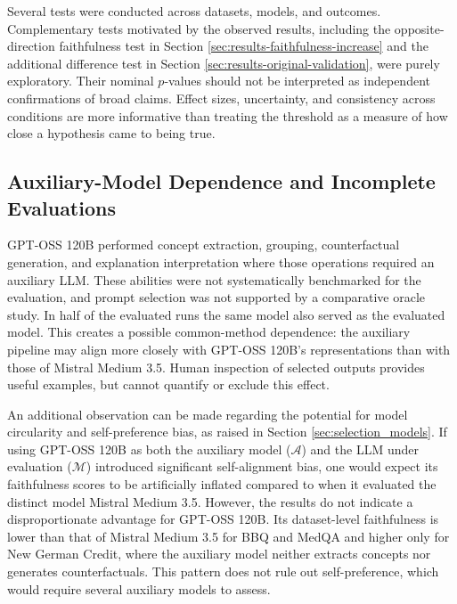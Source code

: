 Several tests were conducted across datasets, models, and outcomes. Complementary tests motivated by the observed results, including the opposite-direction faithfulness test in Section \ref{sec:results-faithfulness-increase} and the additional difference test in Section \ref{sec:results-original-validation}, were purely exploratory. Their nominal $p$-values should not be interpreted as independent confirmations of broad claims. Effect sizes, uncertainty, and consistency across conditions are more informative than treating the threshold as a measure of how close a hypothesis came to being true.

\subsection{Auxiliary-Model Dependence and Incomplete Evaluations}
\label{sec:incomplete_evaluations}

GPT-OSS 120B performed concept extraction, grouping, counterfactual generation, and explanation interpretation where those operations required an auxiliary LLM. These abilities were not systematically benchmarked for the evaluation, and prompt selection was not supported by a comparative oracle study. In half of the evaluated runs the same model also served as the evaluated model. This creates a possible common-method dependence: the auxiliary pipeline may align more closely with GPT-OSS 120B's representations than with those of Mistral Medium 3.5. Human inspection of selected outputs provides useful examples, but cannot quantify or exclude this effect.

An additional observation can be made regarding the potential for model circularity and self-preference bias, as raised in Section \ref{sec:selection_models}. If using GPT-OSS 120B as both the auxiliary model ($\mathcal{A}$) and the LLM under evaluation ($\mathcal{M}$) introduced significant self-alignment bias, one would expect its faithfulness scores to be artificially inflated compared to when it evaluated the distinct model Mistral Medium 3.5. However, the results do not indicate a disproportionate advantage for GPT-OSS 120B. Its dataset-level faithfulness is lower than that of Mistral Medium 3.5 for BBQ and MedQA and higher only for New German Credit, where the auxiliary model neither extracts concepts nor generates counterfactuals. This pattern does not rule out self-preference, which would require several auxiliary models to assess.

